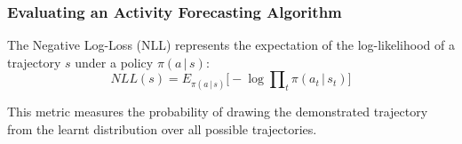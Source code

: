 \begin{frame}
	\frametitle{Evaluating an Activity Forecasting Algorithm}
	
	\Large
	
	\vspace{0.45cm}
	
	The Negative Log-Loss (NLL) represents the expectation of the log-likelihood of a trajectory $ s $
	under a policy $ \pi(a \, | \, s) $:
	\vspace{-0.1cm}
	\begin{equation*}
		NLL(s) = E_{\pi(a \, | \, s)} \Big [ -\log \prod\nolimits_t \pi(a_t \, | \, s_t)  \Big ]
	\end{equation*}
	
	\vspace{0.1cm}
	
	This metric measures the probability of drawing the demonstrated trajectory from the learnt
	distribution over all possible trajectories. \\
\end{frame}

